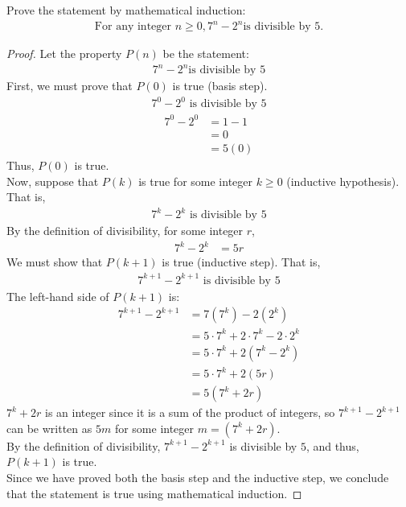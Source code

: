 \documentclass[name=Ojas\ Chaturvedi, emailid=oj.chaturvedi.2024, course=Capstone:\ Discrete\ Math, num=9, deadline={November\ 17,\ 2023}]{homework}
\begin{document}
    Prove the statement by mathematical induction:
    \begin{align*}
        \text{For any integer } n \geq 0, 7^n-2^n \text{is divisible by } 5.
    \end{align*}
\begin{proof}
    Let the property $P(n)$ be the statement:
    \begin{align*}
        7^n-2^n \text{is divisible by } 5
    \end{align*}
    First, we must prove that $P(0)$ is true (basis step).
    \begin{align*}
        7^0-2^0 \text{ is divisible by } 5
    \end{align*}
    \begin{align*}
        7^0-2^0 &= 1-1 \\
        &= 0 \\
        &= 5(0)
    \end{align*}
    Thus, $P(0)$ is true. \\
    Now, suppose that $P(k)$ is true for some integer $k \geq 0$ (inductive hypothesis). That is,
    \begin{align*}
        7^k-2^k \text{ is divisible by } 5
    \end{align*}
    By the definition of divisibility, for some integer $r$,
    \begin{align*}
        7^k-2^k &= 5r
    \end{align*}
    We must show that $P(k+1)$ is true (inductive step). That is,
    \begin{align*}
        7^{k+1}-2^{k+1} \text{ is divisible by } 5
    \end{align*}
    The left-hand side of $P(k+1)$ is:
    \begin{align*}
        7^{k+1}-2^{k+1} &= 7(7^k)-2(2^k) \\
        &= 5\cdot7^k + 2\cdot7^k - 2\cdot2^k \\
        &= 5\cdot7^k + 2(7^k - 2^k) \\
        &= 5\cdot7^k + 2(5r) \\
        &= 5(7^k + 2r)
    \end{align*}
    $7^k + 2r$ is an integer since it is a sum of the product of integers, so $7^{k+1}-2^{k+1}$ can be written as $5m$ for some integer $m = (7^k + 2r)$. \\
    By the definition of divisibility, $7^{k+1}-2^{k+1}$ is divisible by $5$, and thus, $P(k+1)$ is true. \\
    Since we have proved both the basis step and the inductive step, we conclude that the statement is true using mathematical induction. 
\end{proof}
\end{document}
